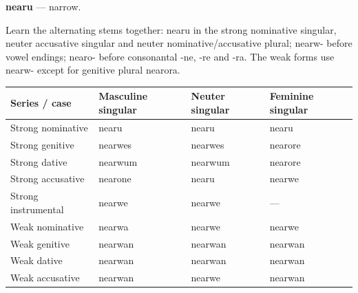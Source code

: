 \par\begin{minipage}{\linewidth}\raggedright
\textbf{nearu} — narrow.

Learn the alternating stems together: nearu in the strong nominative singular, neuter accusative singular and neuter nominative/\allowbreak{}accusative plural; nearw- before vowel endings; nearo- before consonantal -ne, -re and -ra. The weak forms use nearw- except for genitive plural nearora.

\par\begingroup
\fontsize{10.5}{13.2}\selectfont
\setlength{\LTleft}{0pt}\setlength{\LTright}{\fill}
\noindent
\begin{tabular}{@{}>{\raggedright\arraybackslash}p{34.062mm}>{\raggedright\arraybackslash}p{29.341mm}>{\raggedright\arraybackslash}p{25.069mm}>{\raggedright\arraybackslash}p{27.092mm}@{}}
\toprule
\textbf{Series /\allowbreak{} case} & \textbf{Masculine singular} & \textbf{Neuter singular} & \textbf{Feminine singular} \\
\midrule
Strong nominative & nearu & nearu & nearu \\
Strong genitive & nearwes & nearwes & nearore \\
Strong dative & nearwum & nearwum & nearore \\
Strong accusative & nearone & nearu & nearwe \\
Strong instrumental & nearwe & nearwe & — \\
Weak nominative & nearwa & nearwe & nearwe \\
Weak genitive & nearwan & nearwan & nearwan \\
Weak dative & nearwan & nearwan & nearwan \\
Weak accusative & nearwan & nearwe & nearwan \\
\bottomrule
\end{tabular}
\par\endgroup
\end{minipage}\par
\par\addvspace{5pt}
\par\begingroup
\fontsize{10.5}{13.2}\selectfont
\setlength{\LTleft}{0pt}\setlength{\LTright}{\fill}
